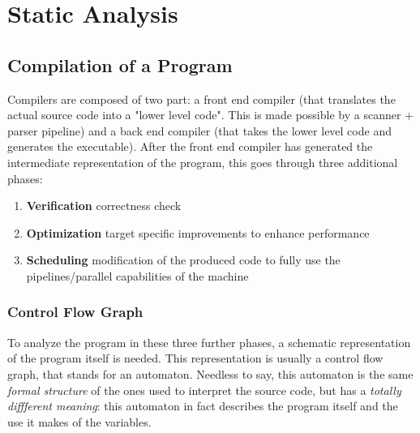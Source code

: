     \section{Static Analysis}
            \subsection{Compilation of a Program}
                Compilers are composed of two part: a front end compiler (that translates the actual source code into a "lower level code". This is made possible by a scanner + parser pipeline) and a back end compiler (that takes the lower level code and generates the executable). After the front end compiler has generated the intermediate representation of the program, this goes through three additional phases:
                \begin{enumerate}
                    \item \textbf{Verification} correctness check
                    \item \textbf{Optimization} target specific improvements to enhance performance
                    \item \textbf{Scheduling} modification of the produced code to fully use the pipelines/parallel capabilities of the machine
                \end{enumerate}
                
                \subsubsection{Control Flow Graph}
                    To analyze the program in these three further phases, a schematic representation of the program itself is needed. This representation is usually a control flow graph, that stands for an automaton. Needless to say, this automaton is the same \emph{formal structure} of the ones used to interpret the source code, but has a \emph{totally diffferent meaning}: this automaton in fact describes the program itself and the use it makes of the variables.
                    
